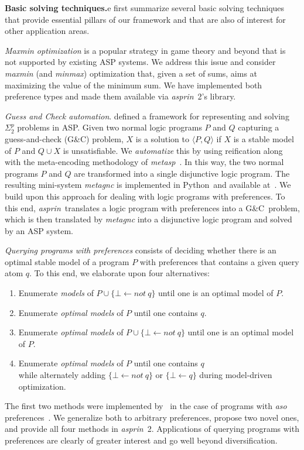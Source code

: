 \documentclass[a4paper,UKenglish]{oasics}
\newcommand{\gc}[0]{G{\&}C}
\newcommand{\sysfont}{\textit}
\newcommand{\metasp}{\sysfont{metasp}}
\newcommand{\asprin}{\sysfont{asprin}}
\newcommand{\python}{Python}
\newcommand{\mysubsection}[2]{\smallskip\noindent\textbf{#1.}}
\newcommand{\mysubparagraph}[1]{\par\textit{#1}}
\begin{document}
\mysubsection{Basic solving techniques}
%
We first summarize several basic solving techniques that provide essential pillars of our framework
and that are also of interest for other application areas.

\mysubparagraph{Maxmin optimization}
%
is a popular strategy in game theory and beyond that is not supported by existing ASP systems.
%
We address this issue and consider \emph{maxmin} (and \textit{minmax}) optimization that,
given a set of sums, aims at maximizing the value of the minimum sum.
%
We have implemented both preference types and made them available via \asprin~2's library.

\mysubparagraph{Guess and Check automation}.
%
\cite{eitpol06a} defined a framework for representing and solving $\Sigma^p_2$ problems in ASP.
%
Given two normal logic programs $P$ and $Q$ capturing a guess-and-check (\gc) problem, 
%
%
$X$ is a solution to $\langle P,Q \rangle$ if $X$ is a stable model of $P$ and $Q \cup X$ is unsatisfiable.
%
We \emph{automatize} this by using reification along with the meta-encoding methodology of \metasp~\cite{gekasc11b}.
In this way, the two normal programs $P$ and $Q$ are transformed into a single disjunctive logic program.
The resulting mini-system \textit{metagnc} is implemented in \python\ and available at~\cite{asprin}.
%
%
We build upon this approach for dealing with logic programs with preferences.
To this end,
\asprin\ translates a logic program with preferences into a \gc\ problem,
which is then translated by \textit{metagnc} into a disjunctive logic program
and solved by an ASP system.

\mysubparagraph{Querying programs with preferences}
%
consists of 
deciding whether there is an optimal stable model of a program $P$ with preferences that contains a given query atom $q$.
%
To this end,
we elaborate upon four alternatives:%
\begin{enumerate}[label={\textcolor{darkgray}{\sffamily\bfseries\mathversion{bold}{Q-\arabic*}}}.]
\item Enumerate \emph{models} of $P \cup \{ \bot \leftarrow not \ q \}$ until one is an optimal model of $P$.
\item Enumerate \emph{optimal models} of $P$ until one contains $q$.
\item Enumerate \emph{optimal models} of $P \cup \{ \bot \leftarrow not \ q \}$ until one is an optimal model of $P$.
\item Enumerate \emph{optimal models} of $P$ until one contains $q$\\
  while alternately adding $\{ \bot \leftarrow not \ q \}$ or $\{ \bot \leftarrow q \}$ during model-driven optimization.
\end{enumerate}
%
The first two methods were implemented by~\cite{zhutru13a} in the case of programs with \emph{aso} preferences~\cite{brnitr03a}.
We generalize both to arbitrary preferences, propose two novel ones, and provide all four methods in \asprin~2.
%
Applications of querying programs with preferences are clearly of greater interest and go well beyond diversification.
\end{document}

